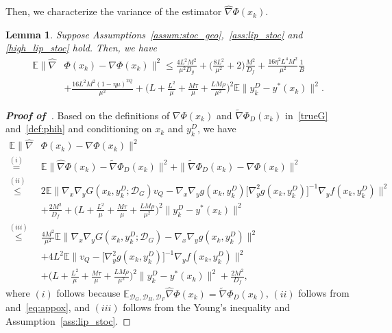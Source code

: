 \documentclass{osudissert96}
\def\gD{{\mathcal{D}}}
\newtheorem{lemma}{Lemma}
\begin{document}
Then, we characterize the variance of the estimator $\widehat \nabla \Phi(x_k)$. 
\begin{lemma}\label{le:variancc} 
Suppose Assumptions~\ref{assum:stoc_geo},~\ref{ass:lip_stoc} and \ref{high_lip_stoc} hold. Then, we have
\begin{align*}
\mathbb{E}\|\widehat \nabla& \Phi(x_k)-\nabla \Phi(x_k)\|^2 \leq   \frac{4L^2M^2}{\mu^2D_g} + \Big(\frac{8L^2}{\mu^2} + 2\Big) \frac{M^2}{D_f}+ \frac{16\eta^2  L^4M^2}{\mu^2} \frac{1}{B} \nonumber
\\&+\frac{16 L^2M^2(1-\eta \mu)^{2Q}}{\mu^2}+ \Big( L+\frac{L^2}{\mu} + \frac{M\tau}{\mu}+\frac{LM\rho}{\mu^2}\Big)^2 \mathbb{E}\|y_k^D-y^*(x_k)\|^2.
\end{align*}
\end{lemma}
\begin{proof}[\bf Proof of~] Based on the definitions of $\nabla \Phi(x_k)$ and $\widetilde \nabla \Phi_D(x_k)$ in~\cref{trueG} and~\cref{def:phih} and conditioning on $x_k$ and $y_k^D$, we have
\begin{align}\label{eq:vbbs}
\mathbb{E}\|\widehat \nabla& \Phi(x_k)-\nabla \Phi(x_k)\|^2  \nonumber
\\\overset{(i)}=& \mathbb{E} \|\widehat \nabla \Phi(x_k)- \widetilde \nabla \Phi_D(x_k)\|^2+\|\widetilde \nabla \Phi_D(x_k)-\nabla \Phi(x_k)\|^2 
\nonumber
\\\overset{(ii)}\leq &2\mathbb{E} \big\|\nabla_x \nabla_y G(x_k,y_k^D;\gD_G) v_Q -\nabla_x \nabla_y g(x_k,y^D_k) \big[\nabla_y^2 g(x_k,y^D_k)\big]^{-1}
\nabla_y f(x_k,y^D_k)\big\|^2  \nonumber
\\&+ \frac{2M^2}{D_f}+ \Big( L+\frac{L^2}{\mu} + \frac{M\tau}{\mu}+\frac{LM\rho}{\mu^2}\Big)^2 \|y_k^D-y^*(x_k)\|^2 \nonumber
\\\overset{(iii)}\leq& \frac{4M^2}{\mu^2}\mathbb{E} \|\nabla_x \nabla_y G(x_k,y_k^D;\gD_G) -\nabla_x \nabla_y g(x_k,y^D_k) \|^2 \nonumber
\\&+ 4L^2\mathbb{E}\|v_Q-\big[\nabla_y^2 g(x_k,y^D_k)\big]^{-1}
\nabla_y f(x_k,y^D_k)\|^2 \nonumber
\\&+ \Big( L+\frac{L^2}{\mu} + \frac{M\tau}{\mu}+\frac{LM\rho}{\mu^2}\Big)^2 \|y_k^D-y^*(x_k)\|^2 + \frac{2M^2}{D_f},
\end{align}
where $(i)$ follows because $\mathbb{E}_{\gD_G,\gD_H,\gD_F} \widehat \nabla \Phi(x_k) =  \widetilde \nabla \Phi_D(x_k)$, $(ii)$ follows from  and~\cref{eq:appox}, and $(iii)$
follows from the Young's inequality and Assumption~\ref{ass:lip_stoc}. 


\end{proof}
\end{document}
